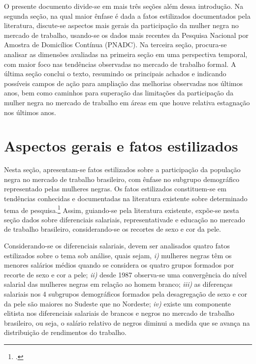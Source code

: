 \documentclass[12pt]{article}
\begin{document}
\par O presente documento divide-se em mais três seções além dessa introdução. Na segunda seção, na qual maior ênfase é dada a fatos estilizados documentados pela literatura, discute-se aspectos mais gerais da participação da mulher negra no mercado de trabalho, usando-se os dados mais recentes da Pesquisa Nacional por Amostra de Domicílios Contínua (PNADC). Na terceira seção, procura-se analisar as dimensões avaliadas na primeira seção em uma perspectiva temporal, com maior foco nas tendências observadas no mercado de trabalho formal. A última seção conclui o texto, resumindo os principais achados e indicando possíveis campos de ação para ampliação das melhorias observadas nos últimos anos, bem como caminhos para superação das limitações da participação da mulher negra no mercado de trabalho em áreas em que houve relativa estagnação nos últimos anos.

\section{Aspectos gerais e fatos estilizados} \label{overview}

\par Nesta seção, apresentam-se fatos estilizados sobre a participação da população negra no mercado de trabalho brasileiro, com ênfase no subgrupo demográfico representado pelas mulheres negras. Os fatos estilizados constituem-se em tendências conhecidas e documentadas na literatura existente sobre determinado tema de pesquisa.\footcite[178]{kaldor1961capital} Assim, guiando-se pela literatura existente, expõe-se nesta seção dados sobre diferenciais salariais, representativade e educação no mercado de trabalho brasileiro, considerando-se os recortes de sexo e cor da pele.

\par Considerando-se os diferenciais salariais, devem ser analisados quatro fatos estilizados sobre o tema sob análise, quais sejam, \textit{i)} mulheres negras têm os menores salários médios quando se considera os quatro grupos formados por recorte de sexo e cor a pele; \textit{ii)} desde 1987 observa-se uma convergência do nível salarial das mulheres negras em relação ao homem branco; \textit{iii)} as diferenças salariais nos 4 subgrupos de\-mo\-grá\-fi\-cos formados pela desagregação de sexo e cor da pele são maiores no Sudeste que no Nordeste; \textit{iv)} existe um componente elitista nos diferenciais salariais de brancos e negros no mercado de trabalho brasileiro, ou seja, o salário relativo de negros diminui a medida que se avança na distribuição de rendimentos do trabalho.
\end{document}
